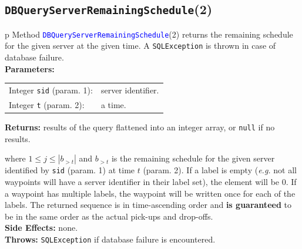 \subsection{\texttt{DBQueryServerRemainingSchedule}(2)}
\begin{tabular}{p{\textwidth}}
\toprule
{}
Method \textcolor{blue}{{\tt{}\protect{}DBQueryServerRemainingSchedule}}(2) returns the
remaining schedule for the given server at the given time.
A {\tt{}SQLException} is thrown in case of database failure.\\
\midrule
\textbf{Parameters:} \\
\begin{tabular}{lp{116mm}}
Integer {\tt{}sid} (param. 1):&server identifier.\\
Integer {\tt{}t} (param. 2):&a time.\\
\end{tabular}
\textbf{Returns:} results of the query flattened into an integer array,
or {\tt{}null} if no results.


where $1\leq j\leq |b_{>t}|$ and $b_{>t}$ is the remaining schedule for the
given server identified by {\tt{}sid} (param. 1) at time $t$ (param. 2).
If a label is empty (\textit{e.g.} not all waypoints will have a server
identifier in their label set), the element will be 0. If a waypoint has
multiple labels, the waypoint will be written once for each of the labels.
The returned sequence is in time-ascending order and \textbf{is guaranteed}
to be in the same order as the actual pick-ups and drop-offs.\\
\textbf{Side Effects:} none.\\
\textbf{Throws:} {\tt{}SQLException} if database failure is encountered.\\
\bottomrule
\end{tabular}
\nwenddocs{}\endmoddef{}
